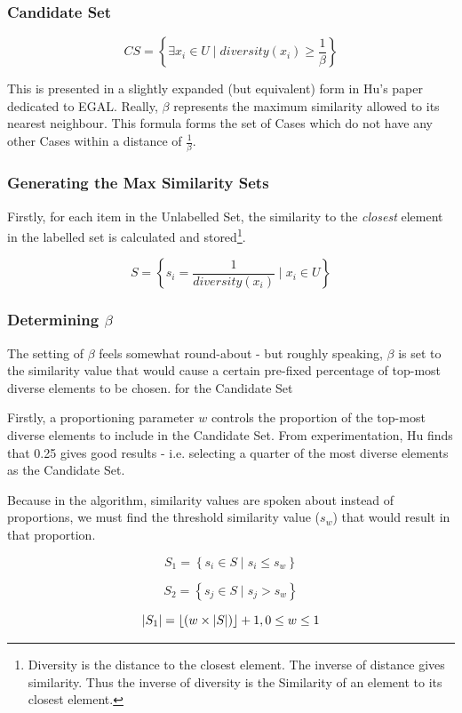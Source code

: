 \documentclass[a4paper,11pt]{report}
\begin{document}
\subsubsection{Candidate Set}
\[
CS=\left\{ \exists x_{i}\in U\mid diversity(x_{i})\geq\frac{1}{\beta}\right\} 
\]

This is presented in a slightly expanded (but equivalent) form in Hu's paper dedicated to EGAL\citep{Hu2010}. Really, $\beta$ represents the maximum similarity allowed to its nearest neighbour. This formula forms the set of Cases which do not have any other Cases within a distance of $\frac{1}{\beta}$.

\subsubsection{Generating the Max Similarity Sets}

Firstly, for each item in the Unlabelled Set, the similarity to the \emph{closest} element in the labelled set is calculated and stored\footnote{Diversity is the distance to the closest element. The inverse of distance gives similarity. Thus the inverse of diversity is the Similarity of an element to its closest element.}.

\[
S=\left\{ s_{i}=\frac{1}{diversity(x_{i})}\mid x_{i}\in U\right\} 
\]

\subsubsection{Determining $\beta$}
The setting of $\beta$ feels somewhat round-about - but roughly speaking, $\beta$ is set to the similarity value that would cause a certain pre-fixed percentage of top-most diverse elements to be chosen. for the Candidate Set

Firstly, a proportioning parameter $w$ controls the proportion of the top-most diverse elements to include in the Candidate Set. From experimentation, Hu finds that 0.25 gives good results - i.e. selecting a quarter of the most diverse elements as the Candidate Set.

Because in the algorithm, similarity values are spoken about instead of proportions, we must find the threshold similarity value ($s_{w}$) that would result in that proportion.

\[
S_{1}=\left\{ s_{i}\in S\mid s_{i}\leq s_{w}\right\} 
\]

\[
S_{2}=\left\{ s_{j}\in S\mid s_{j}>s_{w}\right\} 
\]

\[
\left|S_{1}\right|=\left\lfloor \left(w\times\left|S\right|\right)\right\rfloor +1,\hphantom{}0\leq w\leq 1
\]
\end{document}
